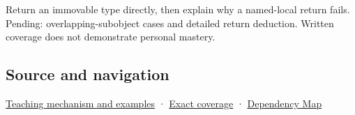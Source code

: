 Return an immovable type directly, then explain why a named-local return fails. Pending: overlapping-subobject cases and detailed return deduction. Written coverage does not demonstrate personal mastery.

\subsection{Source and navigation}\label{appendix-b08d3788c5c6-source-and-navigation}

\hyperref[01-foundations-i-ch003-return-a-result-without-handing-out-a-lifetime-problem]{Teaching mechanism and examples} · \hyperref[appendix-fd090d982a15-m009---parts-127-147]{Exact coverage} · \hyperref[appendix-4ad47bdd269a]{Dependency Map}
